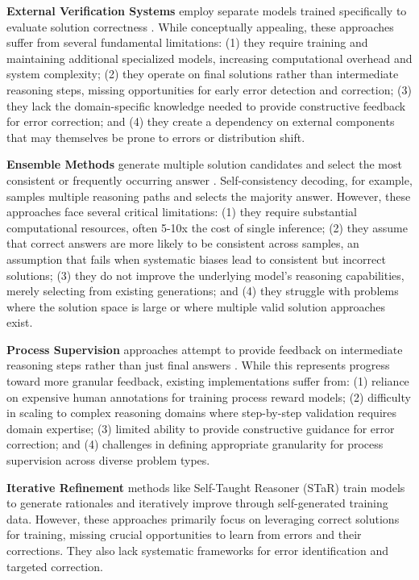 \documentclass[10pt,twocolumn]{article}
\begin{document}
\textbf{External Verification Systems} employ separate models trained specifically to evaluate solution correctness \cite{cobbe2021training, li2022advance}. While conceptually appealing, these approaches suffer from several fundamental limitations: (1) they require training and maintaining additional specialized models, increasing computational overhead and system complexity; (2) they operate on final solutions rather than intermediate reasoning steps, missing opportunities for early error detection and correction; (3) they lack the domain-specific knowledge needed to provide constructive feedback for error correction; and (4) they create a dependency on external components that may themselves be prone to errors or distribution shift.

\textbf{Ensemble Methods} generate multiple solution candidates and select the most consistent or frequently occurring answer \cite{wang2022self, li2022advance}. Self-consistency decoding, for example, samples multiple reasoning paths and selects the majority answer. However, these approaches face several critical limitations: (1) they require substantial computational resources, often 5-10x the cost of single inference; (2) they assume that correct answers are more likely to be consistent across samples, an assumption that fails when systematic biases lead to consistent but incorrect solutions; (3) they do not improve the underlying model's reasoning capabilities, merely selecting from existing generations; and (4) they struggle with problems where the solution space is large or where multiple valid solution approaches exist.

\textbf{Process Supervision} approaches attempt to provide feedback on intermediate reasoning steps rather than just final answers \cite{uesato2022solving, lightman2023lets}. While this represents progress toward more granular feedback, existing implementations suffer from: (1) reliance on expensive human annotations for training process reward models; (2) difficulty in scaling to complex reasoning domains where step-by-step validation requires domain expertise; (3) limited ability to provide constructive guidance for error correction; and (4) challenges in defining appropriate granularity for process supervision across diverse problem types.

\textbf{Iterative Refinement} methods like Self-Taught Reasoner (STaR) \cite{zelikman2022star} train models to generate rationales and iteratively improve through self-generated training data. However, these approaches primarily focus on leveraging correct solutions for training, missing crucial opportunities to learn from errors and their corrections. They also lack systematic frameworks for error identification and targeted correction.
\end{document}
